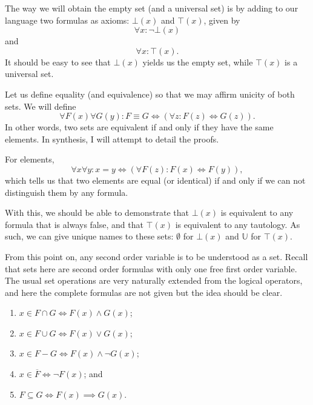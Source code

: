 \documentclass[11pt]{article}
\theoremstyle{plain}
\theoremstyle{nonumberplain}
\newcommand{\wee}{\wedge}
\begin{document}
The way we will obtain the empty set (and a universal set) is by adding to our language two formulas as axioms: $\bot(x)$ and $\top(x)$, given by \begin{equation}
    \forall x : \neg \bot(x)
\end{equation}
and \begin{equation}
    \forall x : \top(x).
\end{equation}
It should be easy to see that $\bot(x)$ yields us the empty set, while $\top(x)$ is a universal set.

Let us define equality (and equivalence) so that we may affirm unicity of both sets. We will define \begin{equation}
    \forall F(x) \forall G(y) : F \equiv G \iff (\forall z : F(z) \iff G(z)).
\end{equation}
In other words, two sets are equivalent if and only if they have the same elements. In synthesis, I will attempt to detail the proofs.

For elements, \begin{equation}
    \forall x \forall y : x = y \iff (\forall F(z) : F(x) \iff F(y)),
\end{equation}
which tells us that two elements are equal (or identical) if and only if we can not distinguish them by any formula.

With this, we should be able to demonstrate that $\bot(x)$ is equivalent to any formula that is always false, and that $\top(x)$ is equivalent to any tautology. As such, we can give unique names to these sets: $\emptyset$ for $\bot(x)$ and $\mathbb{U}$ for $\top(x)$.

From this point on, any second order variable is to be understood as a set. Recall that sets here are second order formulas with only one free first order variable. The usual set operations are very naturally extended from the logical operators, and here the complete formulas are not given but the idea should be clear. \begin{enumerate}
    \item $x \in F \cap G \iff F(x) \wee G(x)$;
    \item $x \in F \cup G \iff F(x) \vee G(x)$;
    \item $x \in F - G \iff F(x) \wee \neg G(x)$;
    \item $x \in \overline{F} \iff \neg F(x)$; and
    \item $F \subseteq G \iff F(x) \implies G(x)$.
\end{enumerate}
\end{document}
